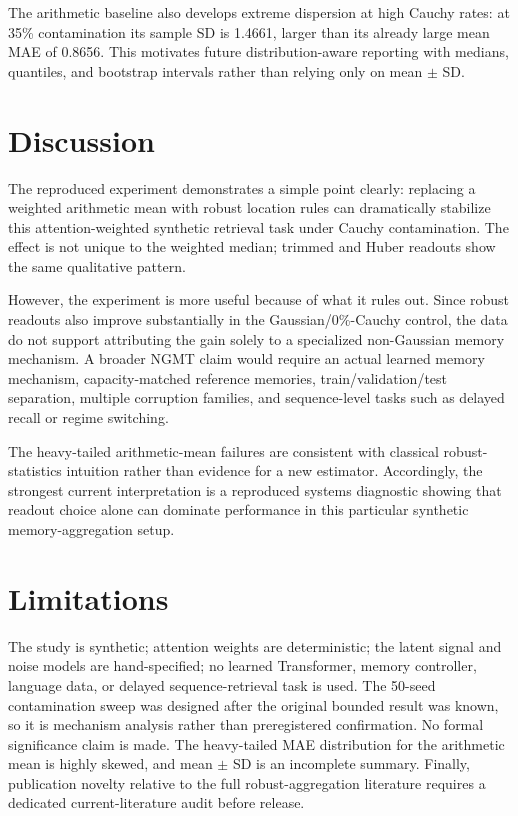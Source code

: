 \documentclass[10pt]{article}
\begin{document}
The arithmetic baseline also develops extreme dispersion at high Cauchy rates: at 35\% contamination its sample SD is 1.4661, larger than its already large mean MAE of 0.8656. This motivates future distribution-aware reporting with medians, quantiles, and bootstrap intervals rather than relying only on mean $\pm$ SD.

\section{Discussion}
The reproduced experiment demonstrates a simple point clearly: replacing a weighted arithmetic mean with robust location rules can dramatically stabilize this attention-weighted synthetic retrieval task under Cauchy contamination. The effect is not unique to the weighted median; trimmed and Huber readouts show the same qualitative pattern.

However, the experiment is more useful because of what it rules out. Since robust readouts also improve substantially in the Gaussian/0\%-Cauchy control, the data do not support attributing the gain solely to a specialized non-Gaussian memory mechanism. A broader NGMT claim would require an actual learned memory mechanism, capacity-matched reference memories, train/validation/test separation, multiple corruption families, and sequence-level tasks such as delayed recall or regime switching.

The heavy-tailed arithmetic-mean failures are consistent with classical robust-statistics intuition rather than evidence for a new estimator. Accordingly, the strongest current interpretation is a reproduced systems diagnostic showing that readout choice alone can dominate performance in this particular synthetic memory-aggregation setup.

\section{Limitations}
The study is synthetic; attention weights are deterministic; the latent signal and noise models are hand-specified; no learned Transformer, memory controller, language data, or delayed sequence-retrieval task is used. The 50-seed contamination sweep was designed after the original bounded result was known, so it is mechanism analysis rather than preregistered confirmation. No formal significance claim is made. The heavy-tailed MAE distribution for the arithmetic mean is highly skewed, and mean $\pm$ SD is an incomplete summary. Finally, publication novelty relative to the full robust-aggregation literature requires a dedicated current-literature audit before release.
\end{document}
